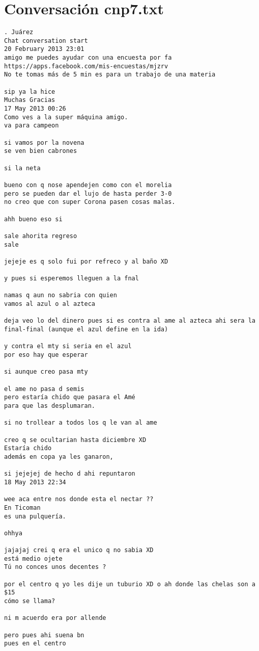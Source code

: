 \section{Conversaci\'on cnp7.txt}
\begin{verbatim}
. Juárez
Chat conversation start
20 February 2013 23:01
amigo me puedes ayudar con una encuesta por fa
https://apps.facebook.com/mis-encuestas/mjzrv
No te tomas más de 5 min es para un trabajo de una materia

sip ya la hice
Muchas Gracias 
17 May 2013 00:26
Como ves a la super máquina amigo.
va para campeon

si vamos por la novena 
se ven bien cabrones

si la neta

bueno con q nose apendejen como con el morelia
pero se pueden dar el lujo de hasta perder 3-0
no creo que con super Corona pasen cosas malas.

ahh bueno eso si

sale ahorita regreso
sale

jejeje es q solo fui por refreco y al baño XD

y pues si esperemos lleguen a la fnal

namas q aun no sabria con quien
vamos al azul o al azteca

deja veo lo del dinero pues si es contra al ame al azteca ahi sera la final-final (aunque el azul define en la ida)

y contra el mty si seria en el azul
por eso hay que esperar

si aunque creo pasa mty

el ame no pasa d semis
pero estaría chido que pasara el Amé
para que las desplumaran.

si no trollear a todos los q le van al ame

creo q se ocultarian hasta diciembre XD
Estaría chido
además en copa ya les ganaron,

si jejejej de hecho d ahi repuntaron
18 May 2013 22:34

wee aca entre nos donde esta el nectar ??
En Ticoman
es una pulquería.

ohhya

jajajaj crei q era el unico q no sabia XD
está medio ojete
Tú no conces unos decentes ?

por el centro q yo les dije un tuburio XD o ah donde las chelas son a $15
cómo se llama?

ni m acuerdo era por allende

pero pues ahi suena bn
pues en el centro


\end{verbatim}
